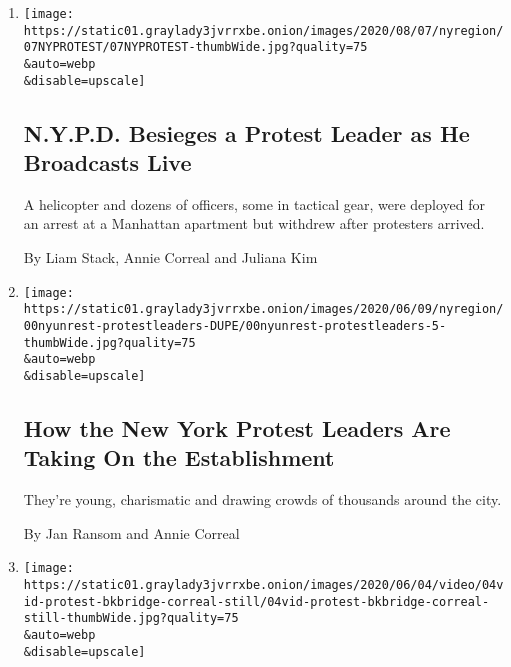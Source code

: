 \begin{enumerate}
\def\labelenumi{\arabic{enumi}.}
\item
  \href{/2020/08/07/nyregion/nypd-derrick-ingram-protester.html}{}

  \texttt{[image: https://static01.graylady3jvrrxbe.onion/images/2020/08/07/nyregion/07NYPROTEST/07NYPROTEST-thumbWide.jpg?quality=75\\\&auto=webp\\\&disable=upscale]}

  \hypertarget{nypd-besieges-a-protest-leader-as-he-broadcasts-live}{%
  \subsection{N.Y.P.D. Besieges a Protest Leader as He Broadcasts
  Live}\label{nypd-besieges-a-protest-leader-as-he-broadcasts-live}}

  A helicopter and dozens of officers, some in tactical gear, were
  deployed for an arrest at a Manhattan apartment but withdrew after
  protesters arrived.

  By Liam Stack, Annie Correal and Juliana Kim
\item
  \href{/2020/06/11/nyregion/nyc-george-floyd-protests.html}{}

  \texttt{[image: https://static01.graylady3jvrrxbe.onion/images/2020/06/09/nyregion/00nyunrest-protestleaders-DUPE/00nyunrest-protestleaders-5-thumbWide.jpg?quality=75\\\&auto=webp\\\&disable=upscale]}

  \hypertarget{how-the-new-york-protest-leaders-are-taking-on-the-establishment}{%
  \subsection{How the New York Protest Leaders Are Taking On the
  Establishment}\label{how-the-new-york-protest-leaders-are-taking-on-the-establishment}}

  They're young, charismatic and drawing crowds of thousands around the
  city.

  By Jan Ransom and Annie Correal
\item
  \href{/live/2020/george-floyd-protests-photos-videos-06-04/a-huge-crowd-marches-from-brooklyn-to-manhattan}{}

  \texttt{[image: https://static01.graylady3jvrrxbe.onion/images/2020/06/04/video/04vid-protest-bkbridge-correal-still/04vid-protest-bkbridge-correal-still-thumbWide.jpg?quality=75\\\&auto=webp\\\&disable=upscale]}

  \hypertarget{a-huge-crowd-marches-from-brooklyn-to-manhattan}{%
}
\end{enumerate}
